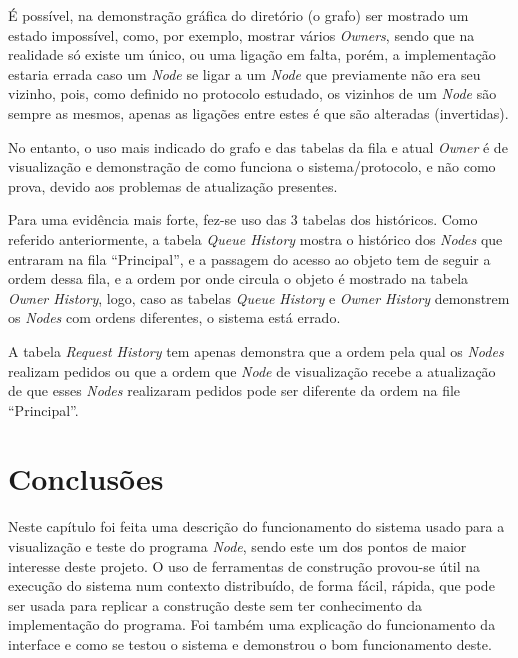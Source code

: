 É possível, na demonstração gráfica do diretório (o grafo) ser mostrado um estado impossível, como, por exemplo, mostrar vários \emph{Owners}, sendo que na realidade só existe um único, ou uma ligação em falta, porém, a implementação estaria errada caso um \emph{Node} se ligar a um \emph{Node} que previamente não era seu vizinho, pois, como definido no protocolo estudado, os vizinhos de um \emph{Node} são sempre as mesmos, apenas as ligações entre estes é que são alteradas (invertidas).

No entanto, o uso mais indicado do grafo e das tabelas da fila e atual \emph{Owner} é de visualização e demonstração de como funciona o sistema/protocolo, e não como prova, devido aos problemas de atualização presentes. 

Para uma evidência mais forte, fez-se uso das 3 tabelas dos históricos. 
Como referido anteriormente, a tabela \emph{Queue History} mostra o histórico dos \emph{Nodes} que entraram na fila ``Principal'', e a passagem do acesso ao objeto tem de seguir a ordem dessa fila, e a ordem por onde circula o objeto é mostrado na tabela \emph{Owner History}, logo, caso as tabelas \emph{Queue History} e \emph{Owner History} demonstrem os \emph{Nodes} com ordens diferentes, o sistema está errado.

A tabela \emph{Request History} tem apenas demonstra que a ordem pela qual os \emph{Nodes} realizam pedidos ou que a ordem que \emph{Node} de visualização recebe a atualização de que esses \emph{Nodes} realizaram pedidos pode ser diferente da ordem na file ``Principal''.



\section{Conclusões}
\label{validacao:sec:conclusoes}
Neste capítulo foi feita uma descrição do funcionamento do sistema usado para a visualização e teste do programa \emph{Node}, sendo este um dos pontos de maior interesse deste projeto. O uso de ferramentas de construção provou-se útil na execução do sistema num contexto distribuído, de forma fácil, rápida, que pode ser usada para replicar a construção deste sem ter conhecimento da implementação do programa. Foi também uma explicação do funcionamento da interface e como se testou o sistema e demonstrou o bom funcionamento deste.
